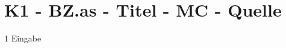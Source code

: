 \section{K1 - BZ.as - Titel - MC - Quelle}

\begin{langesbeispiel} \item[1] %
Eingabe
\end{langesbeispiel}